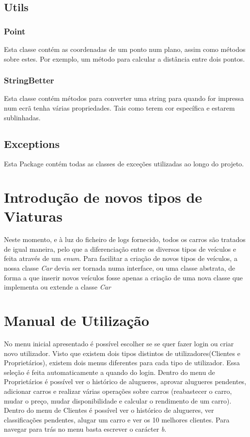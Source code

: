 \documentclass[a4paper]{report}
\begin{document}
\section{Utils}

\subsection{Point}

Esta classe contém as coordenadas de um ponto num plano, assim como métodos sobre estes.
Por exemplo, um método para calcular a distância entre dois pontos.

\subsection{StringBetter}

Esta classe contém métodos para converter uma string para quando for
impressa num ecrã tenha várias propriedades. Tais como terem cor
específica e estarem sublinhadas.

\section{Exceptions}

Esta Package contém todas as classes de exceções utilizadas ao longo do projeto.

\chapter{Introdução de novos tipos de Viaturas}

Neste momento, e à luz do ficheiro de logs fornecido, todos os carros são tratados de igual maneira,
pelo que a diferenciação entre os diversos tipos de veículos e feita através de um \textit{enum}.
Para facilitar a criação de novos tipos de veículos, a nossa classe \textit{Car} 
devia ser tornada numa interface, ou uma classe abstrata, de forma a que inserir novos veículos fosse
apenas a criação de uma nova classe que implementa ou extende a classe \textit{Car}

\chapter{Manual de Utilização}

No menu inicial apresentado é possível escolher se se quer fazer login ou criar novo utilizador.
Visto que existem dois tipos distintos de utilizadores(Clientes e Proprietários), existem dois menus
diferentes para cada tipo de utilizador. Essa seleção é feita automaticamente a quando do login.
Dentro do menu de Proprietários é possível ver o histórico de alugueres, aprovar alugueres pendentes,
 adicionar carros e realizar várias operações sobre carros (reabastecer o carro, mudar o preço, mudar disponibilidade
 e calcular o rendimento de um carro).
Dentro do menu de Clientes é possível ver o histórico de alugueres, ver classificações pendentes, alugar um carro e
ver os 10 melhores clientes.
Para navegar para trás no menu basta escrever o carácter \textit{b}.
\end{document}
